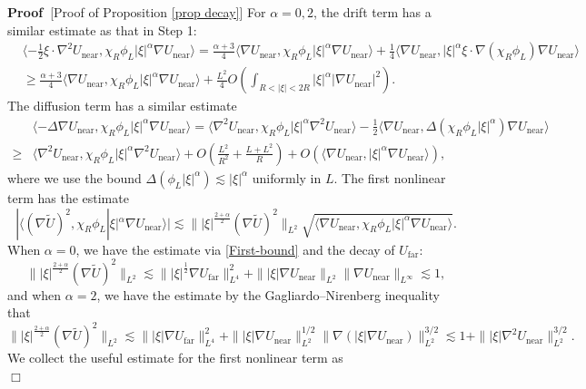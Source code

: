 \documentclass[11pt,a4paper]{article}
\numberwithin{equation}{section}
\newcommand{\cdummy}{\cdot}
\newcommand{\tmop}[1]{\ensuremath{\operatorname{#1}}}
\newenvironment{proof}{\noindent\textbf{Proof\ }}{\hspace*{\fill}$\Box$\medskip}
\begin{document}
\begin{proof}[Proof of Proposition \ref{prop decay}]
For $\alpha=0,2$, the drift term has a similar estimate as that in Step 1:
\[\begin{aligned}
&\langle - \frac{1}{2} \xi \cdummy \nabla^2
       U_{\tmop{near}},\chi_R\phi_{L}|\xi|^\alpha\nabla U_{\tmop{near}}\rangle=\frac{\alpha+3}4\langle 
       \nabla U_{\tmop{near}},\chi_R\phi_{L}|\xi|^\alpha\nabla U_{\tmop{near}}\rangle+\frac{1}{4}\langle 
       \nabla U_{\tmop{near}},|\xi|^\alpha\xi\cdot\nabla(\chi_R\phi_{L})\nabla U_{\tmop{near}}\rangle \\&\geqslant  \frac{\alpha+3}4\langle 
       \nabla U_{\tmop{near}},\chi_R\phi_{L}|\xi|^\alpha\nabla U_{\tmop{near}}\rangle+\frac{L^2}{4}O(\int_{R<|\xi|<2R}|\xi|^\alpha|\nabla U_{\tmop{near}}|^2).
\end{aligned}\]The diffusion term has a similar estimate\[\begin{aligned}
&\langle - \Delta\nabla U_{\tmop{near}},\chi_R\phi_{L}|\xi|^\alpha\nabla U_{\tmop{near}}\rangle=\langle \nabla^2
       U_{\tmop{near}},\chi_R\phi_{L}|\xi|^\alpha\nabla^2 U_{\tmop{near}}\rangle-\frac12\langle 
       \nabla U_{\tmop{near}},\Delta(\chi_R \phi_{L}|\xi|^\alpha)\nabla U_{\tmop{near}}\rangle\\\geqslant&\langle \nabla^2
       U_{\tmop{near}},\chi_R\phi_{L}|\xi|^\alpha\nabla^2 U_{\tmop{near}}\rangle+O(\frac{L^2}{R^2}+\frac{L+L^2}{R})+O(\langle 
       \nabla U_{\tmop{near}}, |\xi|^\alpha\nabla U_{\tmop{near}}\rangle),\end{aligned}\]
       where we use the bound $\Delta(\phi_{L}|\xi|^\alpha)\lesssim|\xi|^\alpha$ uniformly in $L$. The first nonlinear term has the estimate\[|\langle ( \nabla \widetilde{U})^2,\chi_R\phi_{L} |\xi|^\alpha\nabla U_{\tmop{near}}\rangle|\lesssim\||\xi|^{\frac{2+\alpha}{2}}(\nabla \widetilde{U})^2\|_{L^2}\sqrt{\langle \nabla
       U_{\tmop{near}},\chi_R\phi_{L}|\xi|^\alpha\nabla U_{\tmop{near}}\rangle}.\]
       When $\alpha=0$, we have the estimate via \eqref{First-bound} and the decay of $U_{\tmop{far}}$:
       \[\||\xi|^{\frac{2+\alpha}{2}}(\nabla \widetilde{U})^2\|_{L^2}\lesssim\||\xi|^{\frac12}\nabla U_{\tmop{far}}\|_{L^4}^2+\||\xi|\nabla U_{\tmop{near}}\|_{L^2}\|\nabla U_{\tmop{near}}\|_{L^\infty}\lesssim1,\]
       and when $\alpha=2$, we have the estimate by the Gagliardo–Nirenberg inequality that \[\||\xi|^{\frac{2+\alpha}{2}}(\nabla \widetilde{U})^2\|_{L^2}\lesssim\||\xi|\nabla U_{\tmop{far}}\|_{L^4}^2+\||\xi|\nabla U_{\tmop{near}}\|_{L^2}^{1/2}\|\nabla(|\xi|\nabla U_{\tmop{near}})\|_{L^2}^{3/2}\lesssim1+\||\xi|\nabla^2 U_{\tmop{near}}\|_{L^2}^{3/2}.\]
       We collect the useful estimate for the first nonlinear term as\begin{equation}

\end{equation}
\end{proof}
\end{document}
